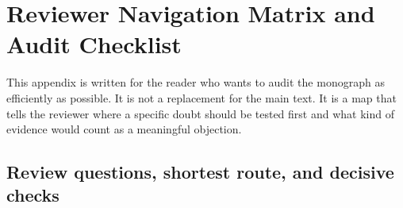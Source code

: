 \section{Reviewer Navigation Matrix and Audit Checklist}
\label{sec:oc13-reviewer-navigation}

This appendix is written for the reader who wants to audit the monograph as efficiently as
possible. It is not a replacement for the main text. It is a map that tells the reviewer where a
specific doubt should be tested first and what kind of evidence would count as a meaningful
objection.

\subsection{Review questions, shortest route, and decisive checks}

